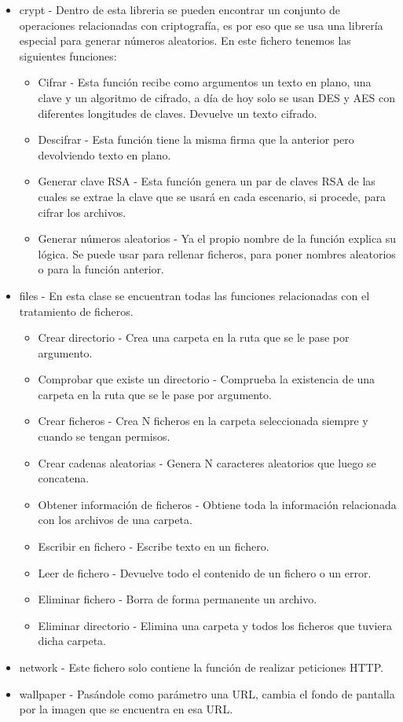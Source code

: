 \documentclass[a4paper,12pt]{article}
\begin{document}
\begin{itemize}
	\item crypt - Dentro de esta libreria se pueden encontrar un conjunto de operaciones relacionadas con criptografía, es por eso que se usa una librería especial para generar números aleatorios. En este fichero tenemos las siguientes funciones:
	\begin{itemize}
		\item Cifrar - Esta función recibe como argumentos un texto en plano, una clave y un algoritmo de cifrado, a día de hoy solo se usan DES y AES con diferentes longitudes de claves. Devuelve un texto cifrado.
		\item Descifrar - Esta función tiene la misma firma que la anterior pero devolviendo texto en plano.
		\item Generar clave RSA - Esta función genera un par de claves RSA de las cuales se extrae la clave que se usará en cada escenario, si procede, para cifrar los archivos.
		\item Generar números aleatorios - Ya el propio nombre de la función explica su lógica. Se puede usar para rellenar ficheros, para poner nombres aleatorios o para la función anterior.
	\end{itemize}
	\item files - En esta clase se encuentran todas las funciones relacionadas con el tratamiento de ficheros.
	\begin{itemize}
		\item Crear directorio - Crea una carpeta en la ruta que se le pase por argumento.
		\item Comprobar que existe un directorio - Comprueba la existencia de una carpeta en la ruta que se le pase por argumento.
		\item Crear ficheros - Crea N ficheros en la carpeta seleccionada siempre y cuando se tengan permisos.
		\item Crear cadenas aleatorias - Genera N caracteres aleatorios que luego se concatena.
		\item Obtener información de ficheros - Obtiene toda la información relacionada con los archivos de una carpeta.
		\item Escribir en fichero - Escribe texto en un fichero.
		\item Leer de fichero - Devuelve todo el contenido de un fichero o un error.
		\item Eliminar fichero - Borra de forma permanente un archivo.
		\item Eliminar directorio - Elimina una carpeta y todos los ficheros que tuviera dicha carpeta.
	\end{itemize}
	\item network - Este fichero solo contiene la función de realizar peticiones HTTP. 
	\item wallpaper - Pasándole como parámetro una URL, cambia el fondo de pantalla por la imagen que se encuentra en esa URL.
\end{itemize} 
\end{document}
